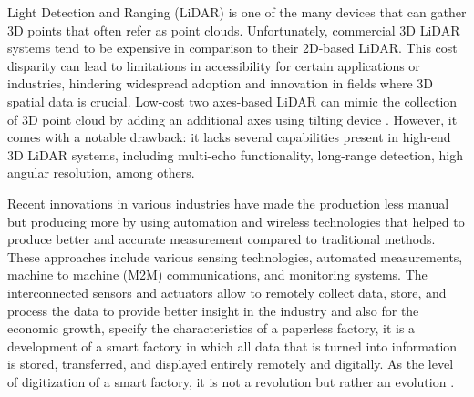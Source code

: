 Light Detection and Ranging (LiDAR) is one of the many devices that can gather 3D points that often refer as point clouds. Unfortunately, commercial 3D LiDAR systems tend to be expensive in comparison to their 2D-based LiDAR. This cost disparity can lead to limitations in accessibility for certain applications or industries, hindering widespread adoption and innovation in fields where 3D spatial data is crucial. Low-cost two axes-based LiDAR can mimic the collection of 3D point cloud by adding an additional axes using tilting device \citep{clar2022}. However, it comes with a notable drawback: it lacks several capabilities present in high-end 3D LiDAR systems, including multi-echo functionality, long-range detection, high angular resolution, among others.

Recent innovations in various industries have made the production less manual but producing more by using automation and wireless technologies that helped to produce better and accurate measurement compared to traditional methods. These approaches include various sensing technologies, automated measurements, machine to machine (M2M) communications, and monitoring systems. The interconnected sensors and actuators allow to remotely collect data, store, and process the data to provide better insight in the industry and also for the economic growth, specify the characteristics of a paperless factory, it is a development of a smart factory in which all data that is turned into information is stored, transferred, and displayed entirely remotely and digitally. As the level of digitization of a smart factory, it is not a revolution but rather an evolution \citep{bulut2020}.


